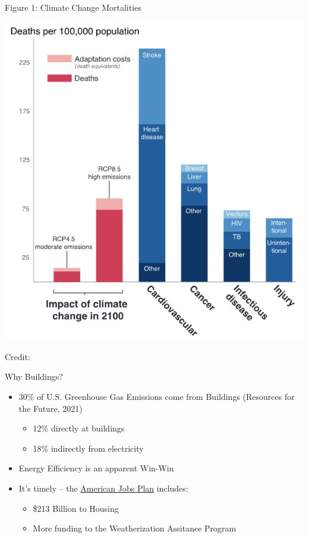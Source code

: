 \documentclass[11pt]{beamer}
\begin{document}
\begin{frame}{Figure 1: Climate Change Mortalities}
\begin{center}
\href{http://www.impactlab.org/research/valuing-the-global-mortality-consequences-of-climate-change-accounting-for-adaptation-costs-and-benefits/}{\includegraphics[scale=.85]{Figure-3.png}}
\end{center}
Credit: \cite{carleton2020valuing}
\end{frame}


\begin{frame}{Why Buildings?}
\begin{itemize}
\item 30\% of U.S. Greenhouse Gas Emissions come from Buildings (Resources for the Future, 2021)
\begin{itemize}
	\item 12\% directly at buildings
	\item 18\% indirectly from electricity
\end{itemize}
\vfill
\pause
\item Energy Efficiency is an apparent Win-Win
\vfill
\pause
\item It's timely -- the \href{https://www.whitehouse.gov/briefing-room/statements-releases/2021/03/31/fact-sheet-the-american-jobs-plan/}{American Jobs Plan} includes:
\begin{itemize}
	\item \$213 Billion to Housing
	\item More funding to the Weatherization Assitance Program
\end{itemize}
\end{itemize}
\end{frame}
\end{document}
